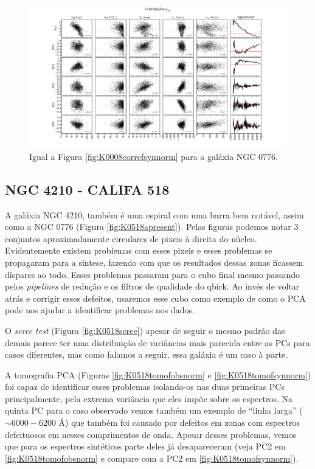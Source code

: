 \begin{figure}
    \includegraphics[width=1.3\textwidth, angle=-90]{figuras/K0073-correl-f_syn_norm-PCvsPhys.pdf}
	\caption[Correlações PCs vs. par\^ametros f\'isicos - $f_{syn}$ - NGC 0001]
	{Igual a Figura \ref{fig:K0008correfsynnorm} para a galáxia NGC 0776.}
    \label{fig:K0073correfsynnorm}
\end{figure}

\subsection{NGC 4210 - CALIFA 518}

A galáxia NGC 4210, também é uma espiral com uma barra bem notável, assim como a NGC 0776 (Figura
\ref{fig:K0518apresent}). Pelas figuras podemos notar 3 conjuntos aproximadamente circulares de pixeis à direita do
núcleo. Evidentemente existem problemas com esses pixeis e esses problemas se propagaram para a síntese, fazendo com que
os resultados dessas zonas ficassem díspares ao todo. Esses problemas passaram para o cubo final mesmo passando pelos
{\em pipelines} de redução e os filtros de qualidade do {\sc qbick}. Ao invés de voltar atrás e corrigir esses defeitos,
usaremos esse cubo como exemplo de como o PCA pode nos ajudar a identificar problemas nos dados.

O {\em scree test} (Figura \ref{fig:K0518scree}) apesar de seguir o mesmo padrão das demais parece ter uma distribuição
de variâncias mais parecida entre as PCs para casos diferentes, mas como falamos a seguir, essa galáxia é um caso à
parte.

A tomografia PCA (Figuras \ref{fig:K0518tomofobsnorm} e \ref{fig:K0518tomofsynnorm}) foi capaz de identificar esses
problemas isolando-os nas duas primeiras PCs principalmente, pela extrema variância que eles impõe sobre os espectros.
Na quinta PC para o caso observado vemos também um exemplo de ``linha larga'' ($\sim6000-6200$ \AA) que também foi
causado por defeitos em zonas com espectros defeituosos em nesses comprimentos de onda. Apesar desses problemas, vemos
que para os espectros sintéticos parte deles já desapareceram (veja PC2 em \ref{fig:K0518tomofobsnorm} e compare com a
PC2 em \ref{fig:K0518tomofsynnorm}).

